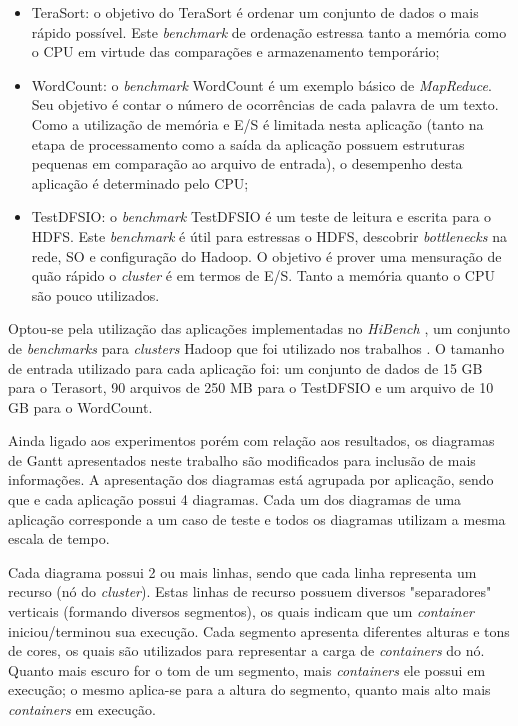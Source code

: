 \begin{itemize}
	\item TeraSort: o objetivo do TeraSort \citep{TeraSort2008} é ordenar um conjunto de dados o mais rápido possível. Este \textit{benchmark} de ordenação estressa tanto a memória como o CPU em virtude das comparações e armazenamento temporário;
	\item WordCount: o \textit{benchmark} WordCount é um exemplo básico de \textit{MapReduce}. Seu objetivo é contar o número de ocorrências de cada palavra de um texto. Como a utilização de memória e E/S é limitada nesta aplicação (tanto na etapa de processamento como a saída da aplicação possuem estruturas pequenas em comparação ao arquivo de entrada), o desempenho desta aplicação é determinado pelo CPU;
	\item TestDFSIO: o \textit{benchmark} TestDFSIO é um teste de leitura e escrita para o HDFS. Este \textit{benchmark} é útil para estressas o HDFS, descobrir \textit{bottlenecks} na rede, SO e configuração do Hadoop. O objetivo é prover uma mensuração de quão rápido o \textit{cluster} é em termos de E/S. Tanto a memória quanto o CPU são pouco utilizados.
\end{itemize}

Optou-se pela utilização das aplicações implementadas no \textit{HiBench} \cite{HiBench}, um conjunto de \textit{benchmarks} para \textit{clusters} Hadoop que foi utilizado nos trabalhos \cite{HBA} \cite{HBB} \cite{HBC}. O tamanho de entrada utilizado para cada aplicação foi: um conjunto de dados de 15 GB para o Terasort, 90 arquivos de 250 MB para o TestDFSIO e um arquivo de 10 GB para o WordCount. 

Ainda ligado aos experimentos porém com relação aos resultados, os diagramas de Gantt apresentados neste trabalho são modificados para inclusão de mais informações. A apresentação dos diagramas está agrupada por aplicação, sendo que e cada aplicação possui 4 diagramas. Cada um dos diagramas de uma aplicação corresponde a um caso de teste e todos os diagramas utilizam a mesma escala de tempo.

Cada diagrama possui 2 ou mais linhas, sendo que cada linha representa  um recurso (nó do \textit{cluster}). Estas linhas de recurso possuem diversos "separadores" verticais (formando diversos segmentos), os quais indicam que um \textit{container} iniciou/terminou sua execução. Cada segmento apresenta diferentes alturas e tons de cores, os quais são utilizados para representar a carga de \textit{containers} do nó. Quanto mais escuro for o tom de um segmento, mais \textit{containers} ele possui em execução; o mesmo aplica-se para a altura do segmento, quanto mais alto mais \textit{containers} em execução.

